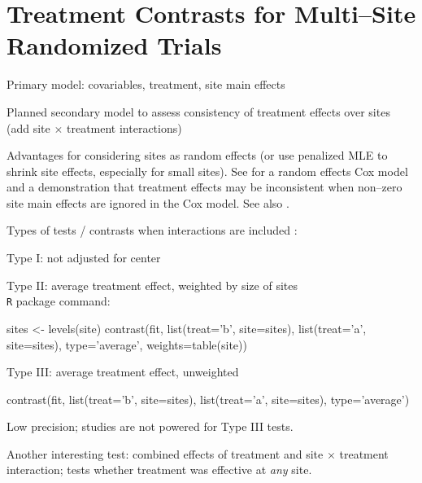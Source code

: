 \section{Treatment Contrasts for Multi--Site Randomized
  Trials}
\bi
\item   Primary model: covariables, treatment, site main effects
\item   Planned secondary model to assess consistency of treatment effects over sites (add site $\times$ treatment interactions)
\item   Advantages for considering sites as random effects (or use penalized MLE to shrink site effects, especially for small sites). See \cite{and99tes} for a random effects Cox model and a demonstration that treatment effects may be inconsistent when non--zero site main effects are ignored in the Cox model.  See also \cite{yam99inv}.
\item   Types of tests / contrasts when interactions are included \ipacue \cite{sch00gen}:
    \bi
    \item   Type I: not adjusted for center
    \item   Type II: average treatment effect, weighted by size of sites \\
    \texttt{R}  package command:
\begin{Schunk}
\begin{Sinput}
sites <- levels(site)
contrast(fit, list(treat='b', site=sites),
              list(treat='a', site=sites),
         type='average', weights=table(site))
\end{Sinput}
\end{Schunk}
    \item   Type III: average treatment effect, unweighted \\
\begin{Schunk}
\begin{Sinput}
contrast(fit, list(treat='b', site=sites),
              list(treat='a', site=sites), type='average')
\end{Sinput}
\end{Schunk}
    Low precision; studies are not powered for Type III tests.
    \ei

\item   Another interesting test: combined effects of treatment and site $\times$ treatment interaction; tests whether treatment was effective at {\em any} site.
\ei

